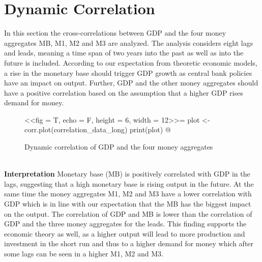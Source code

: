 \documentclass[11pt,a4paper]{report}
\begin{document}
\section{Dynamic Correlation}

In this section the cross-correlations between GDP and the four money aggregates MB, M1, M2 and M3 are analyzed. The analysis considers eight lags and leads, meaning a time span of two years into the past as well as into the future is included. According to our expectation from theoretic economic models, a rise in the monetary base should trigger GDP growth as central bank policies have an impact on output. Further, GDP and the other money aggregates should have a positive correlation based on the assumption that a higher GDP rises demand for money.

\begin{figure}[H]
\caption{Dynamic correlation of GDP and the four money aggregates}
\label{dyn_corr}
\centering
<<fig = T, echo = F, height = 6, width = 12>>=
plot <- corr.plot(correlation_data_long)
print(plot)
@
\end{figure} \ \\\textbf{Interpretation}
\newline
Monetary base (MB) is positively correlated with GDP in the lags, suggesting that a high monetary base is rising output in the future. At the same time the money aggregates M1, M2 and M3 have a lower correlation with GDP which is in line with our expectation that the MB has the biggest impact on the output.
\newline
The correlation of GDP and MB is lower than the correlation of GDP and the three money aggregates for the leads. This finding supports the economic theory as well, as a higher output will lead to more production and investment in the short run and thus to a higher demand for money which after some lags can be seen in a higher M1, M2 and M3. 


\newpage
\end{document}
